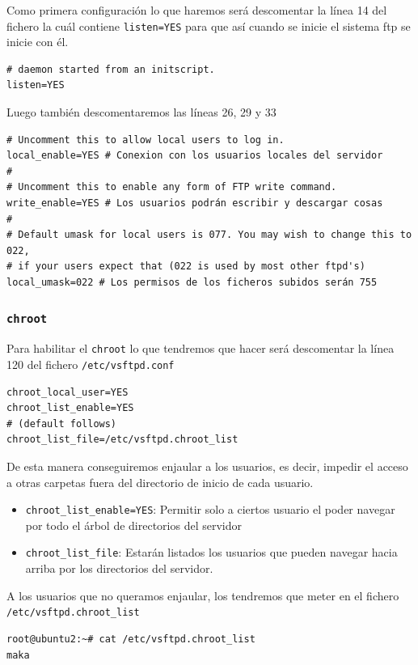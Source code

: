 \documentclass[11pt]{article}
\begin{document}
Como primera configuración lo que haremos será descomentar la línea 14 del fichero la cuál contiene \texttt{listen=YES} para que así cuando se inicie el sistema ftp se inicie con él.
\begin{verbatim}
# daemon started from an initscript.
listen=YES
\end{verbatim}

Luego también descomentaremos las líneas 26, 29 y 33
\begin{verbatim}
# Uncomment this to allow local users to log in.
local_enable=YES # Conexion con los usuarios locales del servidor
#
# Uncomment this to enable any form of FTP write command.
write_enable=YES # Los usuarios podrán escribir y descargar cosas
#
# Default umask for local users is 077. You may wish to change this to 022,
# if your users expect that (022 is used by most other ftpd's)
local_umask=022 # Los permisos de los ficheros subidos serán 755
\end{verbatim}

\subsubsection{\texttt{chroot}}
\label{sec:orgf569387}
Para habilitar el \texttt{chroot} lo que tendremos que hacer será descomentar la línea 120 del fichero \texttt{/etc/vsftpd.conf}
\begin{verbatim}
chroot_local_user=YES
chroot_list_enable=YES
# (default follows)
chroot_list_file=/etc/vsftpd.chroot_list
\end{verbatim}

De esta manera conseguiremos enjaular a los usuarios, es decir, impedir el acceso a otras carpetas fuera del directorio de inicio de cada usuario.

\begin{itemize}
\item \texttt{chroot\_list\_enable=YES}: Permitir solo a ciertos usuario el poder navegar por todo el árbol de directorios del servidor
\item \texttt{chroot\_list\_file}: Estarán listados los usuarios que pueden navegar hacia arriba por los directorios del servidor.
\end{itemize}


A los usuarios que no queramos enjaular, los tendremos que meter en el fichero \texttt{/etc/vsftpd.chroot\_list}
\begin{verbatim}
root@ubuntu2:~# cat /etc/vsftpd.chroot_list 
maka
\end{verbatim}
\end{document}
